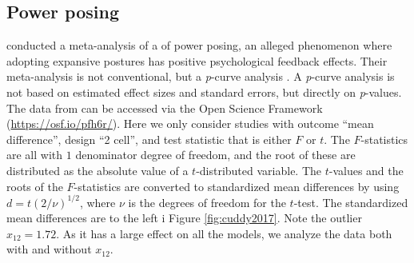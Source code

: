 \documentclass{article}
\theoremstyle{plain}
\theoremstyle{definition}
\renewcommand{\sqrt}[1]{(#1)^{1/2}}
\begin{document}
\subsection{Power posing\label{subsec:cuddy2018}}

\citet{cuddy2018p} conducted a meta-analysis of a of power posing, an alleged phenomenon where adopting expansive postures has positive psychological feedback effects. Their meta-analysis is not conventional, but a \textit{p}-curve analysis \citep{simonsohn2014p}. A \textit{p}-curve analysis is not based on estimated effect sizes and standard errors, but directly on \textit{p}-values. The data from \citep{cuddy2018p} can be accessed via the Open Science Framework (\url{https://osf.io/pfh6r/}). Here we only consider studies with outcome \enquote{mean difference}, design \enquote{2 cell}, and test statistic that is either $F$ or $t$. The $F$-statistics are all with $1$ denominator degree of freedom, and the root of these are distributed as the absolute value of a $t$-distributed variable. The $t$-values and the roots of the $F$-statistics are converted to standardized mean differences by using $d = t\sqrt{2/\nu}$, where $\nu$ is the degrees of freedom for the $t$-test. The standardized mean differences are to the left i Figure \ref{fig:cuddy2017}. Note the outlier $x_{12} = 1.72$. As it has a large effect on all the models, we analyze the data both with and without $x_{12}$.
\end{document}
